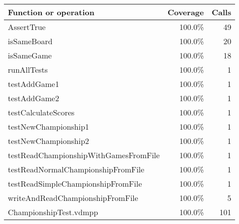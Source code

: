 \begin{longtable}{|l|r|r|}
\hline
Function or operation & Coverage & Calls \\
\hline
\hline
AssertTrue & 100.0\% & 49 \\
\hline
isSameBoard & 100.0\% & 20 \\
\hline
isSameGame & 100.0\% & 18 \\
\hline
runAllTests & 100.0\% & 1 \\
\hline
testAddGame1 & 100.0\% & 1 \\
\hline
testAddGame2 & 100.0\% & 1 \\
\hline
testCalculateScores & 100.0\% & 1 \\
\hline
testNewChampionship1 & 100.0\% & 1 \\
\hline
testNewChampionship2 & 100.0\% & 1 \\
\hline
testReadChampionshipWithGamesFromFile & 100.0\% & 1 \\
\hline
testReadNormalChampionshipFromFile & 100.0\% & 1 \\
\hline
testReadSimpleChampionshipFromFile & 100.0\% & 1 \\
\hline
writeAndReadChampionshipFromFile & 100.0\% & 5 \\
\hline
\hline
ChampionshipTest.vdmpp & 100.0\% & 101 \\
\hline
\end{longtable}

